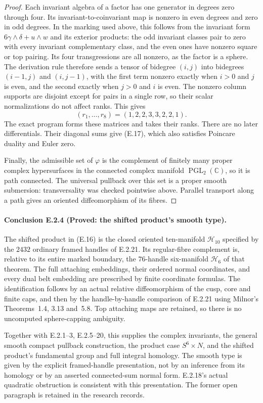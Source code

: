 \begin{proof}
Each invariant algebra of a factor has one generator in degrees
zero through four.  Its invariant-to-coinvariant map is nonzero
in even degrees and zero in odd degrees.  In the marking used
above, this follows from the invariant form
$6\gamma\wedge\delta+u\wedge w$ and its exterior products:
the odd invariant classes pair to zero with every invariant
complementary class, and the even ones have nonzero square or
top pairing.  Its four transgressions are all nonzero, as the
factor is a sphere.  The derivation rule therefore sends a tensor
of bidegree $(i,j)$ into bidegrees $(i-1,j)$ and $(i,j-1)$,
with the first term nonzero exactly when $i>0$ and $j$ is even,
and the second exactly when $j>0$ and $i$ is even.  The nonzero
column supports are disjoint except for pairs in a single row,
so their scalar normalizations do not affect ranks.  This gives
\[
 (r_1,\ldots,r_8)=(1,2,2,3,3,2,2,1).
\]
The exact program forms these matrices and takes their ranks.
There are no later differentials.  Their diagonal sums give
(E.17), which also satisfies Poincare duality and Euler zero.

Finally, the admissible set of $\varphi$ is the complement of
finitely many proper complex hypersurfaces in the connected
complex manifold $\operatorname{PGL}_2(\mathbb C)$, so it is
path connected.  The universal pullback over this set is a
proper smooth submersion: transversality was checked pointwise
above.  Parallel transport along a path gives an oriented
diffeomorphism of its fibres.
\end{proof}

\paragraph{Conclusion E.2.4 (Proved: the shifted product's smooth type).}
The shifted product in (E.16) is the closed oriented ten-manifold
$\mathcal H_{10}$ specified by the $2432$ ordinary framed handles
of E.2.21. Its regular-fibre complement is, relative to its entire
marked boundary, the $76$-handle six-manifold $\mathcal H_6$ of
that theorem. The full attaching embeddings, their ordered normal
coordinates, and every dual belt embedding are prescribed by
finite coordinate formulas. The identification follows by an
actual relative diffeomorphism of the cusp, core and finite caps,
and then by the handle-by-handle comparison of E.2.21 using
Milnor's Theorems~1.4, 3.13 and~5.8. Top attaching maps are
retained, so there is no uncomputed sphere-capping ambiguity.

Together with E.2.1--3, E.2.5--20, this supplies the complex
invariants, the general smooth compact pullback construction,
the product case $S^6\times N$, and the shifted product's
fundamental group and full integral homology. The smooth type
is given by the explicit framed-handle presentation, not by an
inference from its homology or by an asserted connected-sum
normal form. E.2.18's actual quadratic obstruction is consistent
with this presentation. The former open paragraph is retained
in the research records.

